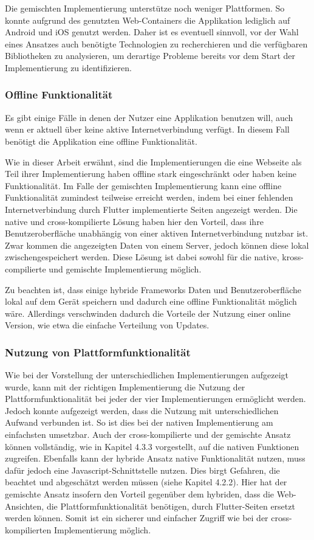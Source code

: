 Die gemischten Implementierung unterstütze noch weniger Plattformen. So konnte aufgrund des genutzten Web-Containers die Applikation lediglich auf Android und iOS genutzt werden.
Daher ist es eventuell sinnvoll, vor der Wahl eines Ansatzes auch benötigte Technologien zu recherchieren und die verfügbaren Bibliotheken zu analysieren, um derartige Probleme bereits vor dem Start der Implementierung zu identifizieren.


\subsubsection{Offline Funktionalität}
Es gibt einige Fälle in denen der Nutzer eine Applikation benutzen will, auch wenn er aktuell über keine aktive Internetverbindung verfügt. In diesem Fall benötigt die Applikation eine offline Funktionalität.

Wie in dieser Arbeit erwähnt, sind die Implementierungen die eine Webseite als Teil ihrer Implementierung haben offline stark eingeschränkt oder haben keine Funktionalität. Im Falle der gemischten Implementierung kann eine offline Funktionalität zumindest teilweise erreicht werden, indem bei einer fehlenden Internetverbindung durch Flutter implementierte Seiten angezeigt werden. Die native und cross-kompilierte Lösung haben hier den Vorteil, dass ihre Benutzeroberfläche unabhängig von einer aktiven Internetverbindung nutzbar ist. Zwar kommen die angezeigten Daten von einem Server, jedoch können diese lokal zwischengespeichert werden. Diese Lösung ist dabei sowohl für die native, kross-compilierte und gemischte Implementierung möglich. 

Zu beachten ist, dass einige hybride Frameworks Daten und Benutzeroberfläche lokal auf dem Gerät speichern und dadurch eine offline Funktionalität möglich wäre. Allerdings verschwinden dadurch die Vorteile der Nutzung einer online Version, wie etwa die einfache Verteilung von Updates.

\subsubsection{Nutzung von Plattformfunktionalität}
Wie bei der Vorstellung der unterschiedlichen Implementierungen aufgezeigt wurde, kann mit der richtigen Implementierung die Nutzung der Plattformfunktionalität bei jeder der vier Implementierungen ermöglicht werden. Jedoch konnte aufgezeigt werden, dass die Nutzung mit unterschiedlichen Aufwand verbunden ist. So ist dies bei der nativen Implementierung am einfachsten umsetzbar. Auch der cross-kompilierte und der gemischte Ansatz können vollständig, wie in Kapitel 4.3.3 vorgestellt, auf die nativen Funktionen zugreifen. Ebenfalls kann der hybride Ansatz native Funktionalität nutzen, muss dafür jedoch eine Javascript-Schnittstelle nutzen. Dies birgt Gefahren, die beachtet und abgeschätzt werden müssen (siehe Kapitel 4.2.2). Hier hat der gemischte Ansatz insofern den Vorteil gegenüber dem hybriden, dass die Web-Ansichten, die Plattformfunktionalität benötigen, durch Flutter-Seiten ersetzt werden können. Somit ist ein sicherer und einfacher Zugriff wie bei der cross-kompilierten Implementierung möglich.
